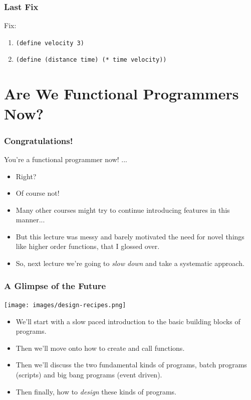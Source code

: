 \documentclass{beamer}
\begin{document}
\begin{frame}
  \frametitle{Last Fix}
  Fix:
  \begin{enumerate}
  \item<1-> \texttt{(define velocity 3)}
  \item<2-> \texttt{(define (distance time) (* time velocity))}
  \end{enumerate}
  \pause
  \versionFive
\end{frame}

\section{Are We Functional Programmers Now?}
\begin{frame}
  \frametitle{Congratulations!}
  You're a functional programmer now! ...
  \begin{itemize}
  \item<2-> Right?
  \item<3-> Of course not!
  \item<4-> Many other courses might try to continue introducing features in this manner...
  \item<5-> But this lecture was messy and barely motivated the need for novel
    things like higher order functions, that I glossed over.
  \item<6-> So, next lecture we're going to \emph{slow down} and take a systematic
    approach.
  \end{itemize}
\end{frame}

\begin{frame}
  \frametitle{A Glimpse of the Future}
  \begin{center}
    \texttt{[image: images/design-recipes.png]}
  \end{center}
  \begin{itemize}
  \item<2-> We'll start with a slow paced introduction to the basic building blocks
    of programs.
  \item<3-> Then we'll move onto how to create and call functions.
  \item<4-> Then we'll discuss the two fundamental kinds of programs, batch programs
    (scripts) and big bang programs (event driven).
  \item<5-> Then finally, how to \emph{design} these kinds of programs.
  \end{itemize}
\end{frame}
\end{document}
